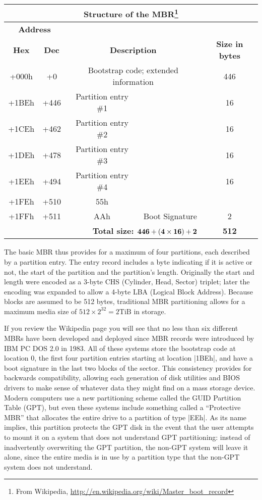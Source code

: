 \begin{minipage}{\textwidth}
\begin{tabular}{|c|c|c|c|c|}
\multicolumn{5}{c}{\bf Structure of the MBR\footnote{From Wikipedia, \url{http://en.wikipedia.org/wiki/Master_boot_record}}}\\
\hline
\multicolumn{2}{|c|}{\bf Address} & \multicolumn{2}{c|}{}                              & \\
\cline{1-2} \bf Hex & \bf Dec         & \multicolumn{2}{c|}{\multirow{-2}{*}{\bf Description}} & \multirow{-2}{*}{\bf Size in bytes}\\
\hline
+000h & +0   & \multicolumn{2}{c|}{Bootstrap code; extended information} & 446 \\
\cline{3-4}
+1BEh & +446 & Partition entry \#1 && 16 \\
+1CEh & +462 & Partition entry \#2 && 16 \\
+1DEh & +478 & Partition entry \#3 && 16 \\
+1EEh & +494 & Partition entry \#4 && 16 \\
\hline
+1FEh & +510 & 55h & & \\
\cline{1-3}
+1FFh & +511 & AAh & \multirow{-2}{*}{Boot Signature} & \multirow{-2}{*}{2} \\
\hline
\hline
\multicolumn{4}{|r|}{\textbf{Total size: $\bf 446 + (4\times16) + 2 $}} & \textbf{512}\\
\hline
\end{tabular}
\end{minipage}

The basic MBR thus provides for a maximum of four partitions, each
described by a partition entry. The entry record includes a byte
indicating if it is active or not, the start of the partition and the
partition's length.  Originally the start and length were encoded as a 
3-byte CHS (Cylinder, Head, Sector) triplet; later the encoding was
expanded to allow a 4-byte LBA (Logical Block
Address). Because blocks
are assumed to be 512 bytes, traditional MBR partitioning allows for a
maximum media size of $512 \times 2^{32}=2\textrm{TiB}$ in storage.

If you review the Wikipedia page you will see that no less than six
different MBRs have been developed and deployed since
MBR records were introduced by IBM PC DOS 2.0 in 1983. All of these
systems store the bootstrap code at location 0, the first four
partition entries starting at location |1BEh|, and have a boot
signature in the last two blocks of the sector. This consistency 
provides for backwards compatibility, allowing each 
generation of disk utilities and BIOS drivers to make sense of
whatever data they might find on a mass storage device.  Modern
computers use a new partitioning scheme called the GUID Partition
Table (GPT), but even these systems include something called
a ``Protective MBR'' that allocates the entire drive to a partition of
type |EEh|. As its name implies, this partition protects the GPT disk in the
event that the user attempts to mount it on a system that does not
understand GPT partitioning: instead of inadvertently overwriting the
GPT partition, the non-GPT system will leave it alone, since the
entire media is in use by a partition type that the non-GPT system does not understand.

